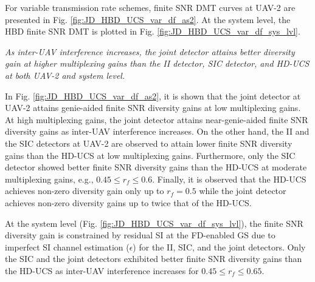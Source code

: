 

For variable transmission rate schemes, finite SNR DMT curves at UAV-2 are presented in Fig. \ref{fig:JD_HBD_UCS_var_df_as2}. At the system level, the HBD finite SNR DMT is plotted in Fig. \ref{fig:JD_HBD_UCS_var_df_sys_lvl}.

\begin{observation}
\emph{\emph{As inter-UAV interference increases, the joint detector attains better diversity gain at higher multiplexing gains than the II detector, SIC detector, and HD-UCS at both UAV-2 and system level.}
}\end{observation}

In Fig. \ref{fig:JD_HBD_UCS_var_df_as2}, it is shown that the joint detector at UAV-2 attains genie-aided finite SNR diversity gains at low multiplexing gains. At high multiplexing gains, the joint detector attains near-genie-aided finite SNR diversity gains as inter-UAV interference increases. On the other hand, the II and the SIC detectors at UAV-2 are observed to attain lower finite SNR diversity gains than the HD-UCS at low multiplexing gains. Furthermore, only the SIC detector showed better finite SNR diversity gains than the HD-UCS at moderate multiplexing gains, e.g., $0.45 \leq r_f \leq 0.6$. Finally, it is observed that the HD-UCS achieves non-zero diversity gain only up to $r_f = 0.5$ while the joint detector achieves non-zero diversity gains up to twice that of the HD-UCS. 

At the system level (Fig. \ref{fig:JD_HBD_UCS_var_df_sys_lvl}), the finite SNR diversity gain is constrained by residual SI at the FD-enabled GS due to imperfect SI channel estimation ($\epsilon$) for the II, SIC, and the joint detectors. Only the SIC and the joint detectors exhibited better finite SNR diversity gains than the HD-UCS as inter-UAV interference increases for  $0.45 \leq r_f \leq 0.65$.

